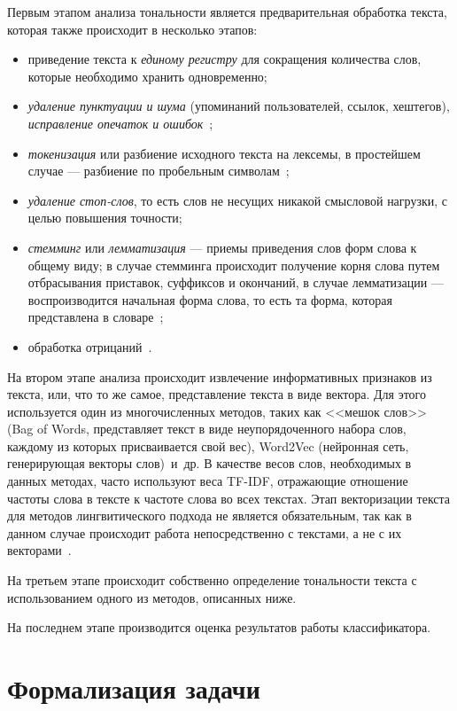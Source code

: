 Первым этапом анализа тональности является предварительная обработка текста,
которая также происходит в несколько этапов:
\begin{itemize}
    \item приведение текста к \textit{единому регистру} для сокращения
        количества слов, которые необходимо хранить одновременно;
    \item \textit{удаление пунктуации и шума} (упоминаний пользователей, ссылок,
        хештегов), \textit{исправление опечаток и ошибок}~\cite{article06};
    \item \textit{токенизация} или разбиение исходного текста на лексемы, в простейшем
        случае --- разбиение по пробельным символам~\cite{article07};
    \item \textit{удаление стоп-слов}, то есть слов не несущих никакой смысловой
        нагрузки, с целью повышения точности;
    \item \textit{стемминг} или \textit{лемматизация} --- приемы приведения слов
        форм слова к общему виду; в случае стемминга происходит получение корня
        слова путем отбрасывания приставок, суффиксов и окончаний, в случае
        лемматизации --- воспроизводится начальная форма слова, то есть та форма,
        которая представлена в словаре~\cite{article06};
    \item обработка отрицаний~\cite{article08}.
\end{itemize}

На втором этапе анализа происходит извлечение информативных признаков из текста,
или, что то же самое, представление текста в виде вектора. Для этого
используется один из многочисленных методов, таких как <<мешок слов>> (Bag of
Words, представляет текст в виде неупорядоченного набора слов,
каждому из которых присваивается свой вес), Word2Vec (нейронная
сеть, генерирующая векторы слов)~и~др. В качестве весов слов, необходимых
в данных методах, часто используют веса TF-IDF, отражающие отношение частоты
слова в тексте к частоте слова во всех текстах. Этап векторизации
текста для методов лингвитического подхода не является обязательным, так
как в данном случае происходит работа непосредственно с текстами, а
не с их векторами~\cite{article09}.

На третьем этапе происходит собственно определение тональности текста с
использованием одного из методов, описанных ниже.

На последнем этапе производится оценка результатов работы классификатора.

\section{Формализация задачи}

